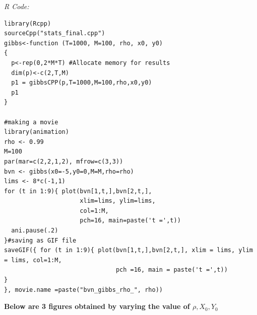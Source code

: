 \documentclass[paper=a4, fontsize=11pt]{scrartcl} %
\numberwithin{equation}{section} %
\numberwithin{figure}{section} %
\numberwithin{table}{section} %
\begin{document}
\textit{R Code:}

\begin{lstlisting}
library(Rcpp)
sourceCpp("stats_final.cpp")
gibbs<-function (T=1000, M=100, rho, x0, y0) 
{
  p<-rep(0,2*M*T) #Allocate memory for results
  dim(p)<-c(2,T,M)
  p1 = gibbsCPP(p,T=1000,M=100,rho,x0,y0) 
  p1
}

#making a movie
library(animation)
rho <- 0.99
M=100
par(mar=c(2,2,1,2), mfrow=c(3,3))
bvn <- gibbs(x0=-5,y0=0,M=M,rho=rho)
lims <- 8*c(-1,1)
for (t in 1:9){ plot(bvn[1,t,],bvn[2,t,],
                     xlim=lims, ylim=lims,
                     col=1:M,
                     pch=16, main=paste('t =',t))
  ani.pause(.2)
}#saving as GIF file
saveGIF({ for (t in 1:9){ plot(bvn[1,t,],bvn[2,t,], xlim = lims, ylim = lims, col=1:M,
                               pch =16, main = paste('t =',t))
}
}, movie.name =paste("bvn_gibbs_rho_", rho))
\end{lstlisting}

\textbf{Below are 3 figures obtained by varying the value of $\rho, X_0, Y_0$ }\\
\end{document}
